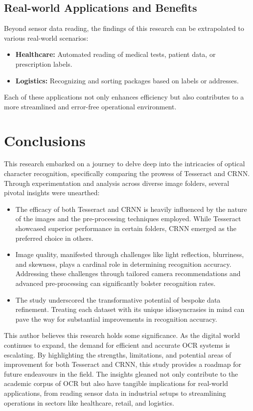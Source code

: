 \subsection{Real-world Applications and Benefits}
Beyond sensor data reading, the findings of this research can be extrapolated to various real-world scenarios:
\begin{itemize}
    \item \textbf{Healthcare:} Automated reading of medical tests, patient data, or prescription labels.
    \item \textbf{Logistics:} Recognizing and sorting packages based on labels or addresses.
\end{itemize}
Each of these applications not only enhances efficiency but also contributes to a more streamlined and error-free operational environment.

\section{Conclusions}

This research embarked on a journey to delve deep into the intricacies of optical character recognition, specifically comparing the prowess of Tesseract and CRNN. Through experimentation and analysis across diverse image folders, several pivotal insights were unearthed:

\begin{itemize}
    \item The efficacy of both Tesseract and CRNN is heavily influenced by the nature of the images and the pre-processing techniques employed. While Tesseract showcased superior performance in certain folders, CRNN emerged as the preferred choice in others.
    \item Image quality, manifested through challenges like light reflection, blurriness, and skewness, plays a cardinal role in determining recognition accuracy. Addressing these challenges through tailored camera recommendations and advanced pre-processing can significantly bolster recognition rates.
    \item The study underscored the transformative potential of bespoke data refinement. Treating each dataset with its unique idiosyncrasies in mind can pave the way for substantial improvements in recognition accuracy.
\end{itemize}

This author believes this research holds some significance. As the digital world continues to expand, the demand for efficient and accurate OCR systems is escalating. By highlighting the strengths, limitations, and potential areas of improvement for both Tesseract and CRNN, this study provides a roadmap for future endeavours in the field. The insights gleaned not only contribute to the academic corpus of OCR but also have tangible implications for real-world applications, from reading sensor data in industrial setups to streamlining operations in sectors like healthcare, retail, and logistics.


